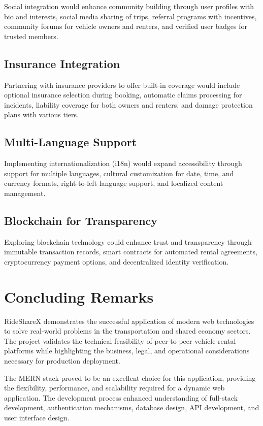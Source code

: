 \documentclass[12pt,a4paper]{report}
\begin{document}
	Social integration would enhance community building through user profiles with bio and interests, social media sharing of trips, referral programs with incentives, community forums for vehicle owners and renters, and verified user badges for trusted members.
	
	\subsection{Insurance Integration}
	
	Partnering with insurance providers to offer built-in coverage would include optional insurance selection during booking, automatic claims processing for incidents, liability coverage for both owners and renters, and damage protection plans with various tiers.
	
	\subsection{Multi-Language Support}
	
	Implementing internationalization (i18n) would expand accessibility through support for multiple languages, cultural customization for date, time, and currency formats, right-to-left language support, and localized content management.
	
	\subsection{Blockchain for Transparency}
	
	Exploring blockchain technology could enhance trust and transparency through immutable transaction records, smart contracts for automated rental agreements, cryptocurrency payment options, and decentralized identity verification.
	
	\section{Concluding Remarks}
	
	RideShareX demonstrates the successful application of modern web technologies to solve real-world problems in the transportation and shared economy sectors. The project validates the technical feasibility of peer-to-peer vehicle rental platforms while highlighting the business, legal, and operational considerations necessary for production deployment.
	
	The MERN stack proved to be an excellent choice for this application, providing the flexibility, performance, and scalability required for a dynamic web application. The development process enhanced understanding of full-stack development, authentication mechanisms, database design, API development, and user interface design.
	
\end{document}
